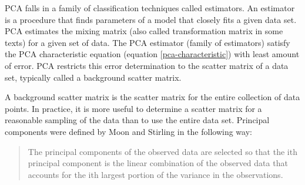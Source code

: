 \documentclass[11pt]{article}
\begin{document}
PCA falls in a family of classification techniques called estimators.  An estimator is a procedure that finds parameters of a model that closely fits a given data set.  PCA estimates the mixing matrix (also called transformation matrix in some texts) for a given set of data.   The PCA estimator (family of estimators) satisfy the PCA characteristic equation (equation \ref{pca-characteristic}) with least amount of error.  PCA restricts this error determination to the scatter matrix of a data set, typically called a background scatter matrix. 

A background scatter matrix is the scatter matrix for the entire collection of data points.  In practice, it is more useful to determine a scatter matrix for a reasonable sampling of the data than to use the entire data set.   %
Principal components were defined by Moon and Stirling in the following way:


\begin{quote}
	The principal components of the observed data are selected so that the ith principal component is the linear combination of the observed data that accounts for the ith largest portion of the variance in the observations.
\cite[329]{moon-stirling-book}
\end{quote}
\end{document}
